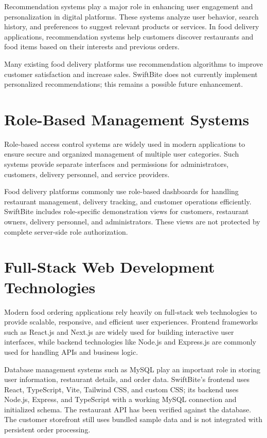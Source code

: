 Recommendation systems play a major role in enhancing user engagement and personalization in digital platforms. These systems analyze user behavior, search history, and preferences to suggest relevant products or services. In food delivery applications, recommendation systems help customers discover restaurants and food items based on their interests and previous orders.

Many existing food delivery platforms use recommendation algorithms to improve customer satisfaction and increase sales. SwiftBite does not currently implement personalized recommendations; this remains a possible future enhancement.

\section{Role-Based Management Systems}

Role-based access control systems are widely used in modern applications to ensure secure and organized management of multiple user categories. Such systems provide separate interfaces and permissions for administrators, customers, delivery personnel, and service providers.

Food delivery platforms commonly use role-based dashboards for handling restaurant management, delivery tracking, and customer operations efficiently. SwiftBite includes role-specific demonstration views for customers, restaurant owners, delivery personnel, and administrators. These views are not protected by complete server-side role authorization.

\section{Full-Stack Web Development Technologies}

Modern food ordering applications rely heavily on full-stack web technologies to provide scalable, responsive, and efficient user experiences. Frontend frameworks such as React.js and Next.js are widely used for building interactive user interfaces, while backend technologies like Node.js and Express.js are commonly used for handling APIs and business logic.

Database management systems such as MySQL play an important role in storing user information, restaurant details, and order data. SwiftBite's frontend uses React, TypeScript, Vite, Tailwind CSS, and custom CSS; its backend uses Node.js, Express, and TypeScript with a working MySQL connection and initialized schema. The restaurant API has been verified against the database. The customer storefront still uses bundled sample data and is not integrated with persistent order processing.

